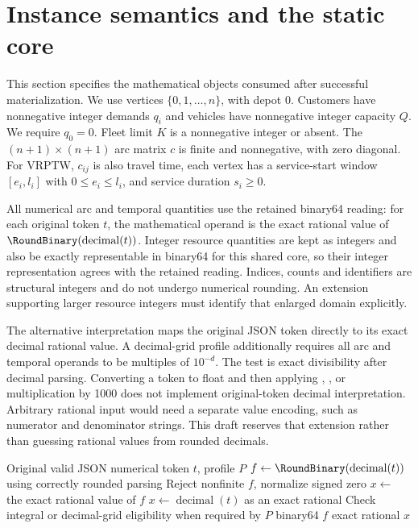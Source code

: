 \section{Instance semantics and the static core}\label{sec:core}
This section specifies the mathematical objects consumed after successful materialization. We use vertices $\{0,1,\ldots,n\}$, with depot 0. Customers have nonnegative integer demands $q_i$ and vehicles have nonnegative integer capacity $Q$. We require $q_0=0$. Fleet limit $K$ is a nonnegative integer or absent. The $(n+1)\times(n+1)$ arc matrix $c$ is finite and nonnegative, with zero diagonal. For VRPTW, $c_{ij}$ is also travel time, each vertex has a service-start window $[e_i,l_i]$ with $0\leq e_i\leq l_i$, and service duration $s_i\geq0$.

All numerical arc and temporal quantities use the retained binary64 reading: for each original token $t$, the mathematical operand is the exact rational value of $\RoundBinary(\operatorname{decimal}(t))$. Integer resource quantities are kept as integers and \must{} also be exactly representable in binary64 for this shared core, so their integer representation agrees with the retained reading. Indices, counts and identifiers are structural integers and do not undergo numerical rounding. An extension supporting larger resource integers must identify that enlarged domain explicitly.

The alternative  interpretation maps the original JSON token directly to its exact decimal rational value. A decimal-grid profile additionally requires all arc and temporal operands to be multiples of $10^{-d}$. The test is exact divisibility after decimal parsing. Converting a token to float and then applying , , or multiplication by 1000 does not implement original-token decimal interpretation. Arbitrary rational input would need a separate value encoding, such as numerator and denominator strings. This draft reserves that extension rather than guessing rational values from rounded decimals.

\begin{algorithm}[htbp]
\caption{Interpret an arc or temporal JSON token under a selected profile}
\begin{algorithmic}[1]
\Require Original valid JSON numerical token $t$, profile $P$
\State $f\gets\RoundBinary(\operatorname{decimal}(t))$ using correctly rounded parsing
\State Reject nonfinite $f$, normalize signed zero
\State $x\gets$ the exact rational value of $f$
\Else
\State $x\gets\operatorname{decimal}(t)$ as an exact rational
\EndIf
\State Check integral or decimal-grid eligibility when required by $P$
\State \Return binary64 $f$
\Else
\State \Return exact rational $x$
\EndIf
\end{algorithmic}
\end{algorithm}

